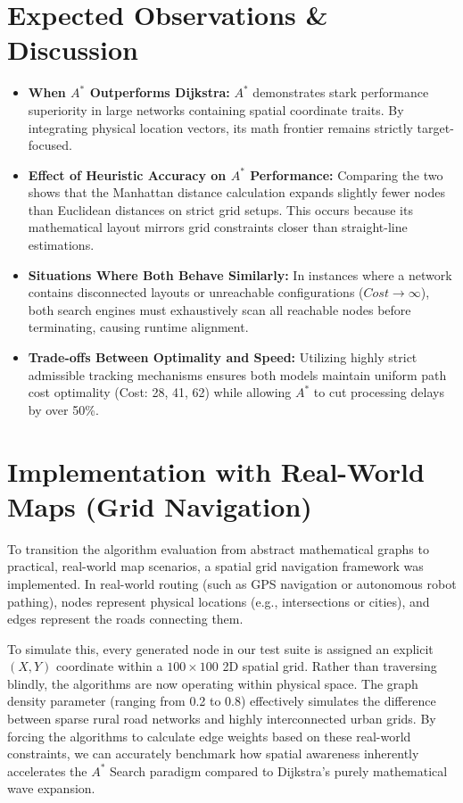 \documentclass[11pt,a4paper]{article}
\begin{document}
\section{Expected Observations \& Discussion}
\begin{itemize}
    \item \textbf{When $A^*$ Outperforms Dijkstra:} $A^*$ demonstrates stark performance superiority in large networks containing spatial coordinate traits. By integrating physical location vectors, its math frontier remains strictly target-focused.
    \item \textbf{Effect of Heuristic Accuracy on $A^*$ Performance:} Comparing the two shows that the Manhattan distance calculation expands slightly fewer nodes than Euclidean distances on strict grid setups. This occurs because its mathematical layout mirrors grid constraints closer than straight-line estimations.
    \item \textbf{Situations Where Both Behave Similarly:} In instances where a network contains disconnected layouts or unreachable configurations ($Cost \to \infty$), both search engines must exhaustively scan all reachable nodes before terminating, causing runtime alignment.
    \item \textbf{Trade-offs Between Optimality and Speed:} Utilizing highly strict admissible tracking mechanisms ensures both models maintain uniform path cost optimality (Cost: 28, 41, 62) while allowing $A^*$ to cut processing delays by over 50\%.
\end{itemize}

\section{Implementation with Real-World Maps (Grid Navigation)}
To transition the algorithm evaluation from abstract mathematical graphs to practical, real-world map scenarios, a spatial grid navigation framework was implemented. In real-world routing (such as GPS navigation or autonomous robot pathing), nodes represent physical locations (e.g., intersections or cities), and edges represent the roads connecting them. 

To simulate this, every generated node in our test suite is assigned an explicit $(X, Y)$ coordinate within a $100 \times 100$ 2D spatial grid. Rather than traversing blindly, the algorithms are now operating within physical space. The graph density parameter (ranging from 0.2 to 0.8) effectively simulates the difference between sparse rural road networks and highly interconnected urban grids. By forcing the algorithms to calculate edge weights based on these real-world constraints, we can accurately benchmark how spatial awareness inherently accelerates the $A^*$ Search paradigm compared to Dijkstra's purely mathematical wave expansion.
\end{document}
